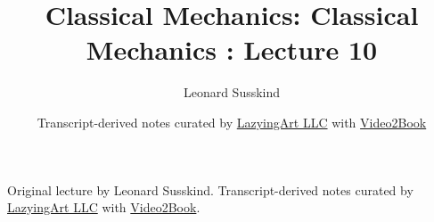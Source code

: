 \documentclass[11pt,oneside]{book}
\begin{document}
\frontmatter
\title{Classical Mechanics: Classical Mechanics : Lecture 10}
\author{Leonard Susskind}
\date{Transcript-derived notes curated by \href{https://lazying.art}{LazyingArt LLC} with \href{https://github.com/lachlanchen/Video2Book}{Video2Book}}
\maketitle
\begin{center}
\small Original lecture by Leonard Susskind. Transcript-derived notes curated by \href{https://lazying.art}{LazyingArt LLC} with \href{https://github.com/lachlanchen/Video2Book}{Video2Book}.
\end{center}
\clearpage
\mainmatter

\end{document}
